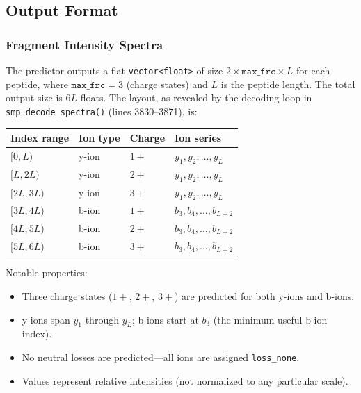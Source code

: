 \documentclass[11pt,a4paper]{article}
\begin{document}
\subsection{Output Format}

\subsubsection{Fragment Intensity Spectra}

The predictor outputs a flat \texttt{vector<float>} of size $2 \times \texttt{max\_frc} \times L$ for each peptide, where $\texttt{max\_frc} = 3$ (charge states) and $L$ is the peptide length. The total output size is $6L$ floats. The layout, as revealed by the decoding loop in \texttt{smp\_decode\_spectra()} (lines 3830--3871), is:

\begin{center}
\begin{tabular}{llll}
\toprule
\textbf{Index range} & \textbf{Ion type} & \textbf{Charge} & \textbf{Ion series} \\
\midrule
$[0, L)$       & y-ion & $1+$ & $y_1, y_2, \ldots, y_L$ \\
$[L, 2L)$      & y-ion & $2+$ & $y_1, y_2, \ldots, y_L$ \\
$[2L, 3L)$     & y-ion & $3+$ & $y_1, y_2, \ldots, y_L$ \\
$[3L, 4L)$     & b-ion & $1+$ & $b_3, b_4, \ldots, b_{L+2}$ \\
$[4L, 5L)$     & b-ion & $2+$ & $b_3, b_4, \ldots, b_{L+2}$ \\
$[5L, 6L)$     & b-ion & $3+$ & $b_3, b_4, \ldots, b_{L+2}$ \\
\bottomrule
\end{tabular}
\end{center}

Notable properties:
\begin{itemize}
    \item Three charge states ($1+$, $2+$, $3+$) are predicted for both y-ions and b-ions.
    \item y-ions span $y_1$ through $y_L$; b-ions start at $b_3$ (the minimum useful b-ion index).
    \item No neutral losses are predicted---all ions are assigned \texttt{loss\_none}.
    \item Values represent relative intensities (not normalized to any particular scale).
\end{itemize}
\end{document}
